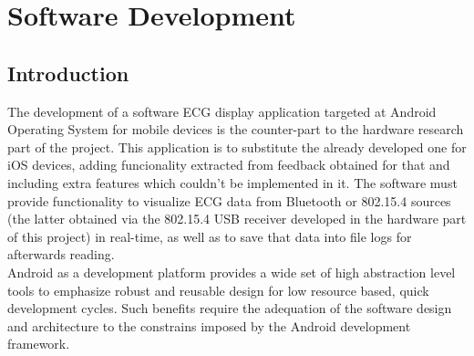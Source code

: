 \chapter{Software Development} %
\label{ch:swdev}

	\section{Introduction}
	\label{sec:sw-intro}

	The development of a software ECG display application targeted at Android Operating System for mobile devices is the counter-part to the hardware research part of the project.
	This application is to substitute the already developed one for iOS devices, adding funcionality extracted from feedback obtained for that and including extra features which couldn't be implemented in it. The software must provide functionality to visualize ECG data from Bluetooth or 802.15.4 sources (the latter obtained via the 802.15.4 USB receiver developed in the hardware part of this project) in real-time, as well as to save that data into file logs for afterwards reading.\\

	Android as a development platform provides a wide set of high abstraction level tools to emphasize robust and reusable design for low resource based, quick development cycles. Such benefits require the adequation of the software design and architecture to the constrains imposed by the Android development framework.\\

